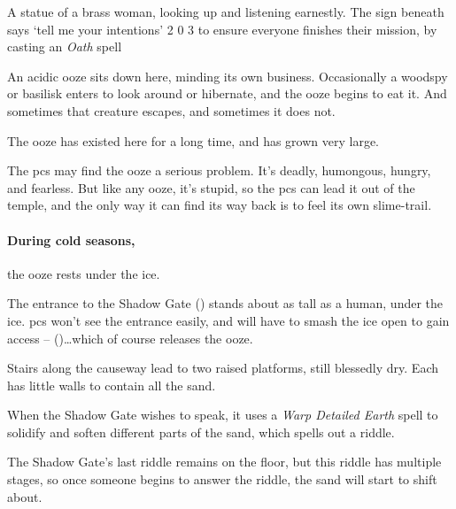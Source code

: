   {A statue of a brass woman, looking up and listening earnestly.
  The sign beneath says `tell me your intentions'}%
  {2}%
  {0}%
  {3}%
  {to ensure everyone finishes their mission, by casting an \textit{Oath} spell}%
  {
    \setcounter{Fate}{2}
    \setcounter{Water}{2}
    \setcounter{Empathy}{2}
    \setcounter{Wyldcrafting}{1}
  }%

\showStdSpells[
  \setcounter{diceNo}{0}
]




An acidic ooze sits down here, minding its own business.
Occasionally a woodspy or basilisk enters to look around or hibernate, and the ooze begins to eat it.
And sometimes that creature escapes, and sometimes it does not.

The ooze has existed here for a long time, and has grown very large.


The \glspl{pc} may find the ooze a serious problem.
It's deadly, humongous, hungry, and fearless.
But like any ooze, it's stupid, so the \glspl{pc} can lead it out of the temple, and the only way it can find its way back is to feel its own slime-trail.

\paragraph{During cold seasons,}
the ooze rests under the ice.

The entrance to the Shadow Gate () stands about as tall as a human, under the ice.
\Glspl{pc} won't see the entrance easily, and will have to smash the ice open to gain access --  (\tn[10])\ldots which of course releases the ooze.


Stairs along the causeway lead to two raised platforms, still blessedly dry.
Each has little walls to contain all the sand.

When the Shadow Gate wishes to speak, it uses a \textit{Warp Detailed Earth} spell to solidify and soften different parts of the sand, which spells out a riddle.

The Shadow Gate's last riddle remains on the floor, but this riddle has multiple stages, so once someone begins to answer the riddle, the sand will start to shift about.

